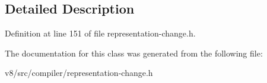 \subsection{Detailed Description}


Definition at line 151 of file representation-\/change.\+h.



The documentation for this class was generated from the following file\+:\begin{DoxyCompactItemize}
\item 
v8/src/compiler/representation-\/change.\+h\end{DoxyCompactItemize}
